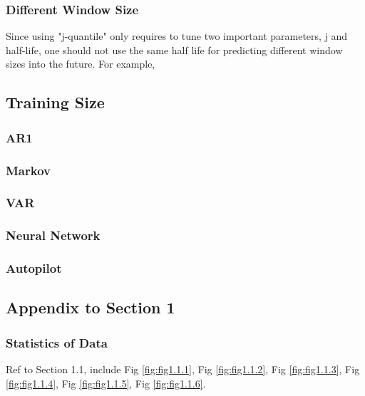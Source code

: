 \documentclass{article}
\begin{document}
\subsubsection{Different Window Size}
\begin{flushleft}
Since using "j-quantile" only requires to tune two important parameters, j and
half-life, one should not use the same half life for predicting different window
sizes into the future. For example, 
\end{flushleft}


\subsection{Training Size}

\subsubsection{AR1}

\subsubsection{Markov}

\subsubsection{VAR}

\subsubsection{Neural Network}

\subsubsection{Autopilot}

\subsection{Appendix to Section 1}

\subsubsection{Statistics of Data}

Ref to Section 1.1, include Fig \ref{fig:fig1.1.1}, Fig \ref{fig:fig1.1.2}, Fig
\ref{fig:fig1.1.3}, Fig \ref{fig:fig1.1.4}, Fig \ref{fig:fig1.1.5}, Fig
\ref{fig:fig1.1.6}.
\end{document}
